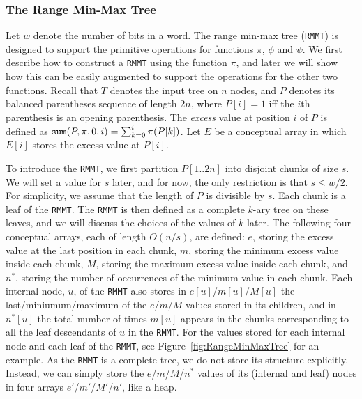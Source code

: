 \subsubsection{The Range Min-Max Tree}

Let $w$ denote the number of bits in a word. The range min-max tree ({\tt RMMT}) is designed to support the primitive operations for functions $\pi$, $\phi$ and $\psi$. %
We first describe how to construct a {\tt RMMT} using the function $\pi$, and later we will show how this can be easily augmented to support the operations for the other two functions. 
Recall that $T$ denotes the input tree on $n$ nodes, and $P$ denotes its balanced parentheses sequence of length $2n$, where $P[i] = 1$ iff the $i$th parenthesis is an opening parenthesis. 
The {\em excess} value at position $i$ of $P$ is defined as $\mathtt{sum}(P,\pi,0,i) = \sum_{k=0}^{i} \pi(P[k])$. 
Let $E$ be a conceptual array in which $E[i]$ stores the excess value at $P[i]$. 

To introduce the {\tt RMMT}, we first partition $P[1..2n]$ into disjoint chunks of size $s$. We will set a value for $s$ later, and for now, the only restriction is that $s \le w/2$. 
For simplicity, we assume that the length of $P$ is divisible by $s$. 
Each chunk is a leaf of the {\tt RMMT}. The {\tt RMMT} is then defined as a complete $k$-ary tree on these leaves, and we will discuss the choices of the values of $k$ later. %
The following four conceptual arrays, each of length $O(n/s)$, are defined: $e$, storing the excess value at the last position in each chunk, $m$, storing the minimum excess value inside
each chunk, $M$, storing the maximum excess value inside each
chunk, and $n^*$, storing the number of occurrences of the minimum
value in each chunk. 
Each internal node, $u$, of the {\tt RMMT} also stores in $e[u]$/$m[u]$/$M[u]$ the last/miniumum/maximum of the $e$/$m$/$M$ values stored in its children, and in $n^*[u]$ the total number of times $m[u]$ appears in the chunks corresponding to all the leaf descendants of $u$ in the {\tt RMMT}. 
For the values stored for each internal node and each leaf of the {\tt RMMT}, see Figure~\ref{fig:RangeMinMaxTree} for an example. 
As the {\tt RMMT} is a complete tree, we do not store its structure explicitly. 
Instead, we can simply store the $e$/$m$/$M$/$n^*$ values of its (internal and leaf) nodes in four arrays $e'$/$m'$/$M'$/$n'$, like a heap. 

